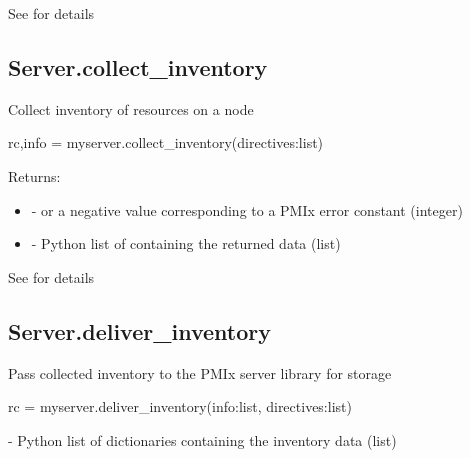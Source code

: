 See  for details


\subsection{Server.collect_inventory}

\summary
Collect inventory of resources on a node

\format

\pyspecificstart
\begin{codepar}
rc,info = myserver.collect_inventory(directives:list)
\end{codepar}
\pyspecificend


\begin{arglist}
\end{arglist}

Returns:

\begin{itemize}
    \item {} -  or a negative value corresponding to a PMIx error constant (integer)
    \item {} - Python list of  containing the returned data (list)
\end{itemize}


See  for details


\subsection{Server.deliver_inventory}

\summary
Pass collected inventory to the \ac{PMIx} server library for storage

\format

\pyspecificstart
\begin{codepar}
rc = myserver.deliver_inventory(info:list, directives:list)
\end{codepar}
\pyspecificend


\begin{arglist}
 - Python list of  dictionaries containing the inventory data (list)
\end{arglist}

